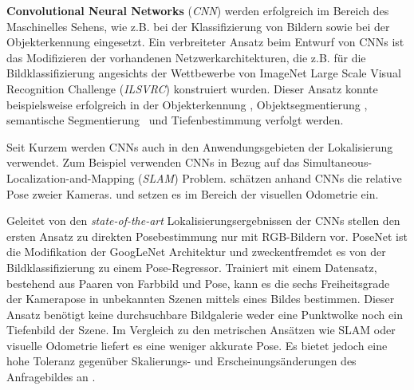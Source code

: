 \textbf{Convolutional Neural Networks} (\textit{CNN}) werden erfolgreich im Bereich des Maschinelles Sehens, wie z.B. bei der Klassifizierung von Bildern \cite{krizhevskyImageNetClassificationDeep2012, simonyanVeryDeepConvolutional2014, heDeepResidualLearning2015} sowie bei der Objekterkennung \cite{girshickRichFeatureHierarchies2013, renFasterRCNNRealTime2015b, girshickFastRCNN2015} eingesetzt. 
Ein verbreiteter Ansatz beim Entwurf von CNNs ist das Modifizieren der vorhandenen Netzwerkarchitekturen, die z.B. für die Bildklassifizierung angesichts der Wettbewerbe von ImageNet Large Scale Visual Recognition Challenge (\textit{ILSVRC}) \cite{russakovskyImageNetLargeScale2015} konstruiert wurden. Dieser Ansatz konnte beispielsweise erfolgreich in der Objekterkennung \cite{girshickFastRCNN2015}, Objektsegmentierung \cite{kokkinosPushingBoundariesBoundary2015, maninisConvolutionalOrientedBoundaries2016}, semantische Segmentierung \cite{nohLearningDeconvolutionNetwork2015, hazirbasFuseNetIncorporatingDepth2017a} und Tiefenbestimmung \cite{liDepthSurfaceNormal2015} verfolgt werden.

Seit Kurzem werden CNNs auch in den Anwendungsgebieten der Lokalisierung verwendet. Zum Beispiel verwenden  \citet{parisottoGlobalPoseEstimation2018} CNNs in Bezug auf das Simultaneous-Localization-and-Mapping (\textit{SLAM}) Problem. \citet{melekhovRelativeCameraPose2017} schätzen anhand CNNs die relative Pose zweier Kameras. \citet{costanteExploringRepresentationLearning2016} und \citet{wangDeepVOEndtoendVisual2017} setzen es im Bereich der visuellen Odometrie ein.

Geleitet von den \textit{state-of-the-art} Lokalisierungsergebnissen der CNNs stellen \citet{kendallPoseNetConvolutionalNetwork2015} den ersten Ansatz zu direkten Posebestimmung nur mit RGB-Bildern vor. PoseNet ist die Modifikation der GoogLeNet \cite{szegedyGoingDeeperConvolutions2015} Architektur und zweckentfremdet es von der Bildklassifizierung zu einem Pose-Regressor. Trainiert mit einem Datensatz, bestehend aus Paaren von Farbbild und Pose, kann es die sechs Freiheitsgrade der Kamerapose in unbekannten Szenen mittels eines Bildes bestimmen. Dieser Ansatz benötigt keine durchsuchbare Bildgalerie weder eine Punktwolke noch ein Tiefenbild der Szene. Im Vergleich zu den metrischen Ansätzen wie SLAM oder visuelle Odometrie liefert es eine weniger akkurate Pose. Es bietet jedoch eine hohe Toleranz gegenüber Skalierungs- und Erscheinungsänderungen des Anfragebildes an \cite{piascoSurveyVisualBasedLocalization2018}.

